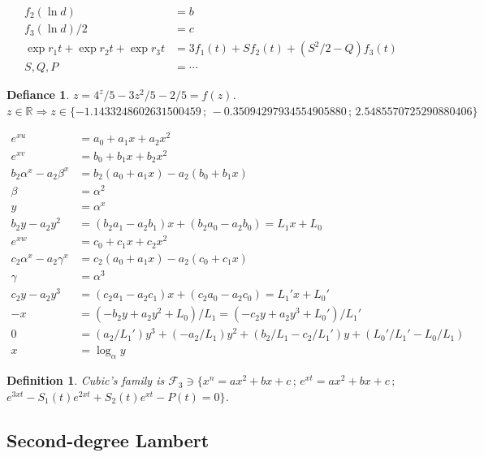 \documentclass[12pt,a4paper]{article}
\newtheorem{defy}{Defiance}
\newtheorem{definition}{Definition}[section]
\begin{document}
\begin{align}
f_2(\ln d) &= b \\
f_3(\ln d)/2 &= c \\
\exp r_1 t + \exp r_2 t + \exp r_3 t &= 3 f_1(t) + S f_2(t) + (S^2/2 - Q) f_3(t) \\
S, Q, P &= \cdots \nonumber
\end{align}

\begin{defy}
$z = 4^z/5 - 3z^2/5 - 2/5 = f(z)$. \\
$z \in \mathbb{R} \Rightarrow z \in \{ -1.1433248602631500459\,;\,-0.35094297934554905880\,;\,2.5485570725290880406  \}$
\end{defy}

\begin{align}
e^{xu} &= a_0 + a_1 x + a_2 x^2 \\
e^{xv} &= b_0 + b_1 x + b_2 x^2 \\
b_2 \alpha^x - a_2 \beta^x &= b_2 (a_0 + a_1 x) - a_2 (b_0 + b_1 x) \\
\beta &= \alpha^2 \\
y &= \alpha^x \\
b_2 y - a_2 y^2 &= (b_2 a_1 - a_2 b_1)x + (b_2 a_0 - a_2 b_0) = L_1 x + L_0 \\
e^{xw} &= c_0 + c_1 x + c_2 x^2 \\
c_2 \alpha^x - a_2 \gamma^x &= c_2 (a_0 + a_1 x) - a_2 (c_0 + c_1 x) \\
\gamma &= \alpha^3 \\
c_2 y - a_2 y^3 &= (c_2 a_1 - a_2 c_1)x + (c_2 a_0 - a_2 c_0) = L_1' x + L_0' \\
- x &= (-b_2 y + a_2 y^2 + L_0)/L_1 = (-c_2 y + a_2 y^3 + L_0')/L_1' \\
0 &= (a_2/L_1') y^3 + (- a_2/L_1) y^2 + (b_2/L_1 - c_2/L_1') y + (L_0'/L_1' - L_0/L_1) \\
x &= \log_{\alpha} y
\end{align}

\begin{definition}
Cubic's family is $\mathcal{F}_3 \ni \{ x^n = ax^2 + bx + c\,;\,e^{xt} = ax^2 + bx + c\,;\,$ \\
$e^{3xt} - S_1(t) e^{2xt} + S_2(t) e^{xt} - P(t) = 0 \}$.
\end{definition}

\subsection{Second-degree Lambert}
\end{document}
